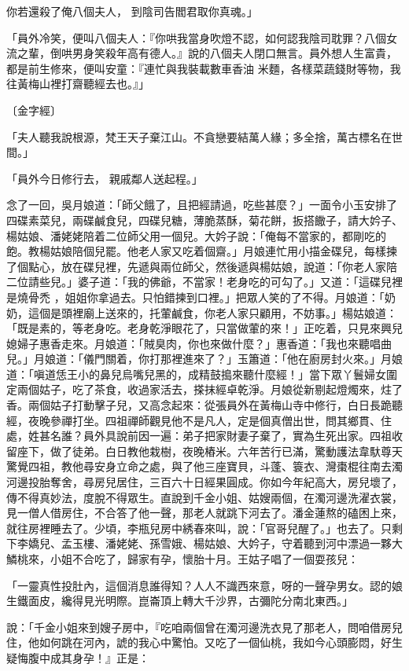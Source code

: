 \begin{showcontents}{}
你若還殺了俺八個夫人，  到陰司告閻君取你真魂。」

「員外冷笑，便叫八個夫人：『你哄我當身吹燈不認，如何認我陰司耽罪？八個女流之輩，倒哄男身笑殺年高有德人。』說的八個夫人閉口無言。員外想人生富貴，都是前生修來，便叫安童：『連忙與我裝載數車香油 米麵，各樣菜蔬錢財等物，我往黃梅山裡打齋聽經去也。』」

〔金字經〕

「夫人聽我說根源，梵王天子棄江山。不貪戀要結萬人緣；多全捨，萬古標名在世間。」

「員外今日修行去，  親戚鄰人送起程。」

念了一回，吳月娘道：「師父餓了，且把經請過，吃些甚麼？」一面令小玉安排了四碟素菜兒，兩碟鹹食兒，四碟兒糖，薄脆蒸酥，菊花餅，扳搭饊子，請大妗子、楊姑娘、潘姥姥陪着二位師父用一個兒。大妗子說：「俺每不當家的，都剛吃的飽。教楊姑娘陪個兒罷。他老人家又吃着個齋。」月娘連忙用小描金碟兒，每樣揀了個點心，放在碟兒裡，先遞與兩位師父，然後遞與楊姑娘，說道：「你老人家陪二位請些兒。」婆子道：「我的佛爺，不當家！老身吃的可勾了。」又道：「這碟兒裡是燒骨禿 ，姐姐你拿過去。只怕錯揀到口裡。」把眾人笑的了不得。月娘道：「奶奶，這個是頭裡廟上送來的，托葷鹹食，你老人家只顧用，不妨事。」楊姑娘道：「既是素的，等老身吃。老身乾淨眼花了，只當做葷的來！」正吃着，只見來興兒媳婦子惠香走來。月娘道：「賊臭肉，你也來做什麼？」惠香道：「我也來聽唱曲兒。」月娘道：「儀門關着，你打那裡進來了？」玉簫道：「他在廚房封火來。」月娘道：「嗔道恁王小的鼻兒烏嘴兒黑的，成精鼓搗來聽什麼經！」當下眾丫鬟婦女圍定兩個姑子，吃了茶食，收過家活去，搽抹經卓乾淨。月娘從新剔起燈燭來，炷了香。兩個姑子打動擊子兒，又高念起來：從張員外在黃梅山寺中修行，白日長跪聽經，夜晚參禪打坐。四祖禪師觀見他不是凡人，定是個真僧出世，問其鄉貫、住處，姓甚名誰？員外具說前因一遍：弟子把家財妻子棄了，實為生死出家。四祖收留座下，做了徒弟。白日教他栽樹，夜晚樁米。六年苦行已滿，驚動護法韋馱尊天驚覺四祖，教他尋安身立命之處，與了他三座寶貝，斗蓬、簑衣、灣棗棍往南去濁河邊投胎奪舍，尋房兒居住，三百六十日經果圓成。你如今年紀高大，房兒壞了，傳不得真妙法，度脫不得眾生。直說到千金小姐、姑嫂兩個，在濁河邊洗濯衣裳，見一僧人借房住，不合答了他一聲，那老人就跳下河去了。潘金蓮熬的磕困上來，就往房裡睡去了。少頃，李瓶兒房中綉春來叫，說：「官哥兒醒了。」也去了。只剩下李嬌兒、孟玉樓、潘姥姥、孫雪娥、楊姑娘、大妗子，守着聽到河中漂過一夥大鱗桃來，小姐不合吃了，歸家有孕，懷胎十月。王姑子唱了一個耍孩兒：

「一靈真性投肚內，這個消息誰得知？人人不識西來意，呀的一聲孕男女。認的娘生鐵面皮，纔得見光明際。崑崙頂上轉大千沙界，古彌陀分南北東西。」

說：「千金小姐來到嫂子房中，『吃咱兩個曾在濁河邊洗衣見了那老人，問咱借房兒住，他如何跳在河內，諕的我心中驚怕。又吃了一個仙桃，我如今心頭膨悶，好生疑悔腹中成其身孕！』正是：


\end{showcontents}
